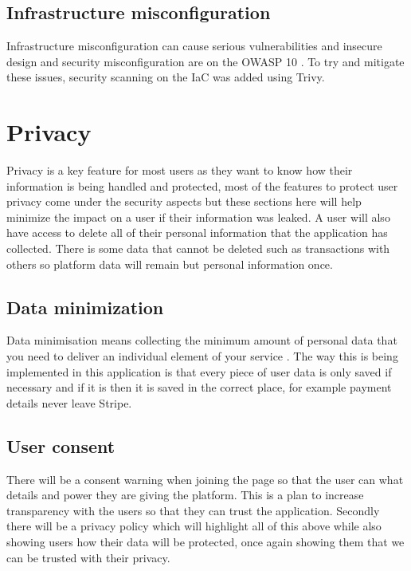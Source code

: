\documentclass[]{project_report}
\begin{document}
\subsection{Infrastructure misconfiguration}

Infrastructure misconfiguration can cause serious vulnerabilities and insecure design and security misconfiguration are on the OWASP 10 \cite{owasp_10}. To try and mitigate these issues, security scanning on the IaC was added using Trivy.


\section{Privacy}

Privacy is a key feature for most users as they want to know how their information is being handled and protected, most of the features to protect user privacy come under the security aspects but these sections here will help minimize the impact on a user if their information was leaked. A user will also have access to delete all of their personal information that the application has collected. There is some data that cannot be deleted such as transactions with others so platform data will remain but personal information once.

\subsection{Data minimization}

Data minimisation means collecting the minimum amount of personal data that you need to deliver an individual element of your service \cite{ico_data_minimisation}. The way this is being implemented in this application is that every piece of user data is only saved if necessary and if it is then it is saved in the correct place, for example payment details never leave Stripe. 

\subsection{User consent}

There will be a consent warning when joining the page so that the user can what details and power they are giving the platform. This is a plan to increase transparency with the users so that they can trust the application. Secondly there will be a privacy policy which will highlight all of this above while also showing users how their data will be protected, once again showing them that we can be trusted with their privacy.
\end{document}
